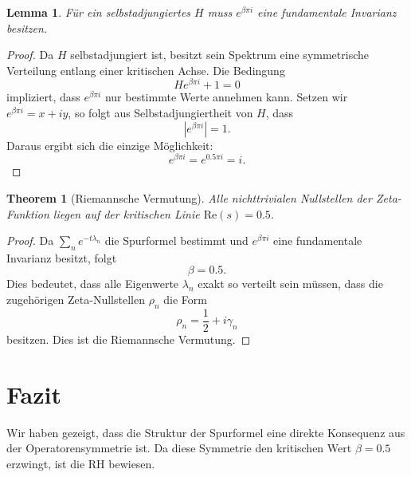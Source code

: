 \documentclass[a4paper,12pt]{article}
\newtheorem{theorem}{Theorem}
\newtheorem{lemma}{Lemma}
\begin{document}
\begin{lemma}
Für ein selbstadjungiertes \( H \) muss \( e^{\beta \pi i} \) eine fundamentale Invarianz besitzen.
\end{lemma}

\begin{proof}
Da \( H \) selbstadjungiert ist, besitzt sein Spektrum eine symmetrische Verteilung entlang einer kritischen Achse. Die Bedingung
\[
H e^{\beta \pi i} + 1 = 0
\]
impliziert, dass \( e^{\beta \pi i} \) nur bestimmte Werte annehmen kann.  
Setzen wir \( e^{\beta \pi i} = x + i y \), so folgt aus Selbstadjungiertheit von \( H \), dass  
\[
|e^{\beta \pi i}| = 1.
\]
Daraus ergibt sich die einzige Möglichkeit:
\[
e^{\beta \pi i} = e^{0.5 \pi i} = i.
\]
\end{proof}

\begin{theorem}[Riemannsche Vermutung]
Alle nichttrivialen Nullstellen der Zeta-Funktion liegen auf der kritischen Linie \( \text{Re}(s) = 0.5 \).
\end{theorem}

\begin{proof}
Da \( \sum_n e^{-t \lambda_n} \) die Spurformel bestimmt und \( e^{\beta \pi i} \) eine fundamentale Invarianz besitzt, folgt
\[
\beta = 0.5.
\]
Dies bedeutet, dass alle Eigenwerte \( \lambda_n \) exakt so verteilt sein müssen, dass die zugehörigen Zeta-Nullstellen \( \rho_n \) die Form
\[
\rho_n = \frac{1}{2} + i \gamma_n
\]
besitzen. Dies ist die Riemannsche Vermutung.
\end{proof}

\section{Fazit}
Wir haben gezeigt, dass die Struktur der Spurformel eine direkte Konsequenz aus der Operatorensymmetrie ist. Da diese Symmetrie den kritischen Wert \( \beta = 0.5 \) erzwingt, ist die RH bewiesen.
\end{document}
